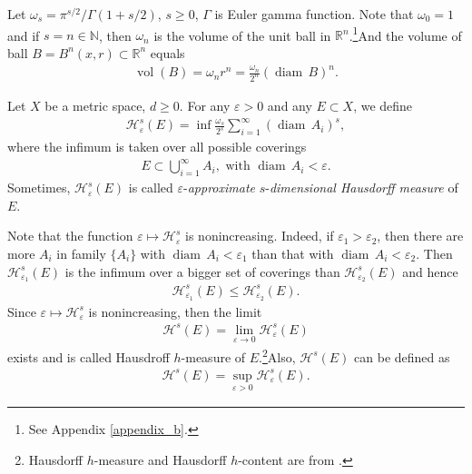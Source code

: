 \documentclass[11pt]{book}
\theoremstyle{definition}
\numberwithin{equation}{chapter}
\def\H{{\mathcal H}}
\def\diam{{\operatorname{diam}\,}}
\begin{document}
Let $\omega_s = \pi^{s/2} / \Gamma(1 + s/2)$, $s \geq 0$, $\Gamma$ is Euler gamma function. Note that $\omega_0 = 1$ and if $s = n \in \mathbb{N}$, then $\omega_n$ is the volume of the unit ball in $\mathbb{R}^n$.\footnote{See Appendix \ref{appendix_b}.}And the volume of ball $B = B^n(x,r) \subset \mathbb{R}^n$ equals 
\begin{align*}
    \operatorname{vol}(B) = \omega_n r^n = \frac{\omega_n}{2^n} \left(\diam B\right)^n.
\end{align*}

Let $X$ be a metric space, $d \geq 0$. For any $\varepsilon > 0$ and any $E \subset X$, we define
\begin{align*}
    \mathcal{H}^s_{\varepsilon}(E) = \inf \frac{\omega_s}{2^s} \sum^\infty_{i=1} \left(\diam A_i\right)^s,
\end{align*}
where the infimum is taken over all possible coverings
\begin{align*}
    E \subset \bigcup^\infty_{i=1} A_i, \,\, \text{with} \,\, \diam A_i < \varepsilon.
\end{align*}
Sometimes, $\H^s_\varepsilon(E)$ is called $\varepsilon$-{\em approximate} $s$-{\em dimensional Hausdorff measure} of $E$\cite{5}.

Note that the function $\varepsilon \mapsto \mathcal{H}^s_{\varepsilon}$ is nonincreasing. Indeed, if $\varepsilon_1 > \varepsilon_2$, then there are more $A_i$ in family $\{A_i\}$ with $\diam A_i < \varepsilon_1$ than that with $\diam A_i < \varepsilon_2$. Then $\mathcal{H}^s_{\varepsilon_1}(E)$ is the infimum over a bigger set of coverings than $\mathcal{H}^s_{\varepsilon_2}(E)$ and hence 
\begin{align*}
    \mathcal{H}^s_{\varepsilon_1}(E) \leq \mathcal{H}^s_{\varepsilon_2}(E).
\end{align*}
Since $\varepsilon \mapsto \mathcal{H}^s_{\varepsilon}$ is nonincreasing, then the limit
\begin{align*}
    \mathcal{H}^s(E) = \lim_{\varepsilon \to 0} \mathcal{H}^s_{\varepsilon}(E)
\end{align*}
exists and is called Hausdroff $h$-measure of $E$.\footnote{Hausdorff $h$-measure and Hausdorff $h$-content are from \cite{6} \label{footnote_hausdorff_content}.}Also, $\mathcal{H}^s(E)$ can be defined as
\begin{align*}
    \mathcal{H}^s(E) = \sup_{\varepsilon > 0} \H^s_\varepsilon(E).
\end{align*}

\medskip
\end{document}

